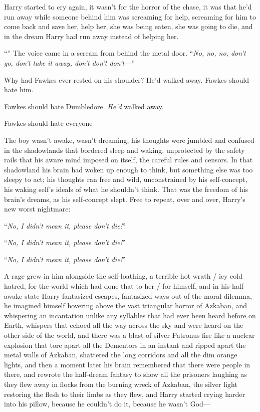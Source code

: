Harry started to cry again, it wasn’t for the horror of the chase, it was that he’d run away while someone behind him was screaming for help, screaming for him to come back and save her, help her, she was being eaten, she was going to die, and in the dream Harry had run away instead of helping her.

“” The voice came in a scream from behind the metal door. “\emph{No, no, no, don’t go, don’t take it away, don’t don’t don’t—}”

Why had Fawkes ever rested on his shoulder? He’d walked away. Fawkes should hate him.

Fawkes should hate Dumbledore. \emph{He’d} walked away.

Fawkes should hate everyone—

The boy wasn’t awake, wasn’t dreaming, his thoughts were jumbled and confused in the shadowlands that bordered sleep and waking, unprotected by the safety rails that his aware mind imposed on itself, the careful rules and censors. In that shadowland his brain had woken up enough to think, but something else was too sleepy to act; his thoughts ran free and wild, unconstrained by his self-concept, his waking self’s ideals of what he shouldn’t think. That was the freedom of his brain’s dreams, as his self-concept slept. Free to repeat, over and over, Harry’s new worst nightmare:

“\emph{No, I didn’t mean it, please don’t die!}”

“\emph{No, I didn’t mean it, please don’t die!}”

“\emph{No, I didn’t mean it, please don’t die!}”

A rage grew in him alongside the self-loathing, a terrible hot wrath / icy cold hatred, for the world which had done that to her / for himself, and in his half-awake state Harry fantasized escapes, fantasized ways out of the moral dilemma, he imagined himself hovering above the vast triangular horror of Azkaban, and whispering an incantation unlike any syllables that had ever been heard before on Earth, whispers that echoed all the way across the sky and were heard on the other side of the world, and there was a blast of silver Patronus fire like a nuclear explosion that tore apart all the Dementors in an instant and ripped apart the metal walls of Azkaban, shattered the long corridors and all the dim orange lights, and then a moment later his brain remembered that there were people in there, and rewrote the half-dream fantasy to show all the prisoners laughing as they flew away in flocks from the burning wreck of Azkaban, the silver light restoring the flesh to their limbs as they flew, and Harry started crying harder into his pillow, because he couldn’t do it, because he wasn’t God—


